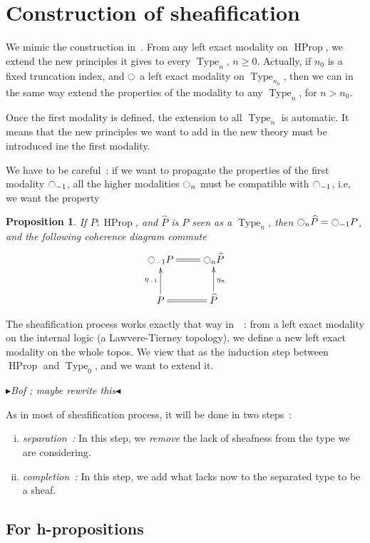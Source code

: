 \documentclass[conference]{IEEEtran}
\newtheorem{prop}[thm]{Proposition}
\newcommand{\mynote}[2]{
    \fbox{\bfseries\sffamily\scriptsize#1}
    {\small$\blacktriangleright$\textsf{\emph{#2}}$\blacktriangleleft$}~}
\newcommand\kq[1]{\mynote{KQ}{#1}}
\newcommand{\ie}{i.e,\xspace}
\DeclareMathOperator{\Type}{Type}
\DeclareMathOperator{\HProp}{HProp}
\newcommand{\modal}{\ensuremath{\ocircle}}
\begin{document}
\section{Construction of sheafification}
\label{sec:sheafification}

We mimic the construction in~\cite{maclanemoerdijk}. 
From any left exact modality on $\HProp$, we extend the new principles
it gives to every $\Type_n,\,n\geqslant 0$.
Actually, if $n_0$ is a fixed truncation index, and $\modal$ a left
exact modality on $\Type_{n_0}$, then we can in the same
way extend the properties of the modality to any $\Type_n$, for
$n > n_0$.

Once the first modality is defined, the extension to all $\Type_n$ is
automatic. It means that the new principles we want to add in the new
theory must be introduced ine the first modality. 

We have to be careful~: if we want to propagate the properties of the
first modality $\modal_{-1}$, all the higher modalities $\modal_n$ must be compatible
with $\modal_{-1}$, \ie we want the property
\begin{prop}\label{prop:hprop}
  If $P:\HProp$, and $\widehat P$ is $P$ seen as a $\Type_n$, then $\modal_n \widehat P = \modal_{-1} P$, and the
  following coherence diagram commute 
  $$\xymatrix{
    \modal_{-1} P \ar@{=}[r] & \modal_n \widehat P \\
    P \ar@{=}[r] \ar[u]^{\eta_{-1}} & \widehat P \ar[u]_{\eta_n}
  }$$
\end{prop}

The sheafification process works exactly that way
in~\cite{maclanemoerdijk}~: from a left exact modality on the internal
logic (a Lawvere-Tierney topology), we define a new left exact
modality on the whole topos. We view that as the induction step
between $\HProp$ and $\Type_0$, and we want to extend it.

\kq{Bof ; maybe rewrite this}

As in most of sheafification process, it will be done in
two steps~:
\begin{enumerate}[(i)]
\item {\em separation~:} In this step, we {\em remove} the lack of
  sheafness from the type we are considering.
\item {\em completion~:} In this step, we add what lacks now to the
  separated type to be a sheaf.
\end{enumerate}
\subsection{For h-propositions}
\label{ssec:h-propositions}
\end{document}
